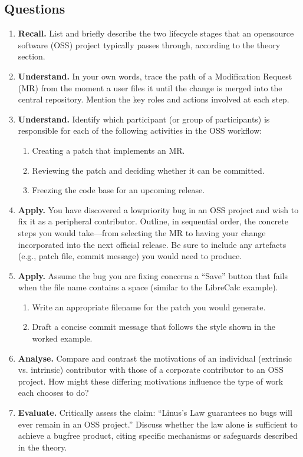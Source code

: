 \documentclass[12pt, a4paper]{article}
\begin{document}
\subsection*{Questions}
\begin{enumerate}
  \item \textbf{Recall.} List and briefly describe the two lifecycle stages that an opensource software (OSS) project typically passes through, according to the theory section.
  \newpage
  \item \textbf{Understand.} In your own words, trace the path of a Modification Request (MR) from the moment a user files it until the change is merged into the central repository. Mention the key roles and actions involved at each step.
  \newpage
  \item \textbf{Understand.} Identify which participant (or group of participants) is responsible for each of the following activities in the OSS workflow:  
  \begin{enumerate}
    \item Creating a patch that implements an MR.  
    \item Reviewing the patch and deciding whether it can be committed.  
    \item Freezing the code base for an upcoming release.
  \end{enumerate}
  \newpage
  \item \textbf{Apply.} You have discovered a lowpriority bug in an OSS project and wish to fix it as a peripheral contributor. Outline, in sequential order, the concrete steps you would take---from selecting the MR to having your change incorporated into the next official release. Be sure to include any artefacts (e.g., patch file, commit message) you would need to produce.
  \newpage
  \item \textbf{Apply.} Assume the bug you are fixing concerns a ``Save'' button that fails when the file name contains a space (similar to the LibreCalc example).  
  \begin{enumerate}
    \item Write an appropriate filename for the patch you would generate.  
    \item Draft a concise commit message that follows the style shown in the worked example.
  \end{enumerate}
  \newpage
  \item \textbf{Analyse.} Compare and contrast the motivations of an individual (extrinsic vs. intrinsic) contributor with those of a corporate contributor to an OSS project. How might these differing motivations influence the type of work each chooses to do?
  \newpage
  \item \textbf{Evaluate.} Critically assess the claim: ``Linus's Law guarantees no bugs will ever remain in an OSS project.'' Discuss whether the law alone is sufficient to achieve a bugfree product, citing specific mechanisms or safeguards described in the theory.
\end{enumerate}
\newpage
\end{document}
